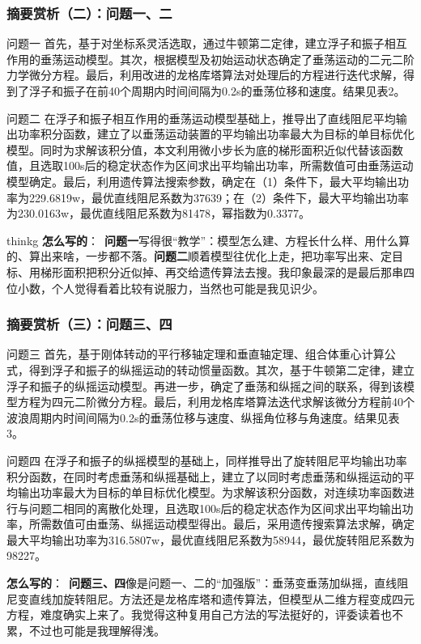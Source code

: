 \documentclass[aspectratio=169]{beamer}
\newcommand{\remarkg}[2]{%
	\vspace{0.12cm}%
	\begin{beamercolorbox}[rounded=true,sep=6pt]{thinkg}%
		{\color{orchidgold}\textbf{#1}：}~#2%
	\end{beamercolorbox}%
}
\newcommand{\remarkp}[2]{%
	\vspace{0.12cm}%
	{\color{orchidpurple}\textbf{#1}：}~#2\par%
}
\begin{document}
\begin{frame}
	\frametitle{摘要赏析（二）：问题一、二}
	\scriptsize
	\begin{block}{问题一}
		首先，基于对坐标系灵活选取，通过牛顿第二定律，建立浮子和振子相互作用的垂荡运动模型。其次，根据模型及初始运动状态确定了垂荡运动的二元二阶力学微分方程。最后，利用改进的龙格库塔算法对处理后的方程进行迭代求解，得到了浮子和振子在前40个周期内时间间隔为0.2s的垂荡位移和速度。结果见表2。
	\end{block}
	\begin{block}{问题二}
		在浮子和振子相互作用的垂荡运动模型基础上，推导出了直线阻尼平均输出功率积分函数，建立了以垂荡运动装置的平均输出功率最大为目标的单目标优化模型。同时为求解该积分值，本文利用微小步长为底的梯形面积近似代替该函数值，且选取100s后的稳定状态作为区间求出平均输出功率，所需数值可由垂荡运动模型确定。最后，利用遗传算法搜索参数，确定在（1）条件下，最大平均输出功率为229.6819w，最优直线阻尼系数为37639；在（2）条件下，最大平均输出功率为230.0163w，最优直线阻尼系数为81478，幂指数为0.3377。
	\end{block}
	\medskip
	\remarkg{怎么写的}{\textbf{问题一}写得很``教学''：模型怎么建、方程长什么样、用什么算的、算出来啥，一步都不落。\textbf{问题二}顺着模型往优化上走，把功率写出来、定目标、用梯形面积把积分近似掉、再交给遗传算法去搜。我印象最深的是最后那串四位小数，个人觉得看着比较有说服力，当然也可能是我见识少。}
\end{frame}

\begin{frame}
	\frametitle{摘要赏析（三）：问题三、四}
	\scriptsize
	\begin{block}{问题三}
		首先，基于刚体转动的平行移轴定理和垂直轴定理、组合体重心计算公式，得到浮子和振子的纵摇运动的转动惯量函数。其次，基于牛顿第二定律，建立浮子和振子的纵摇运动模型。再进一步，确定了垂荡和纵摇之间的联系，得到该模型方程为四元二阶微分方程。最后，利用龙格库塔算法迭代求解该微分方程前40个波浪周期内时间间隔为0.2s的垂荡位移与速度、纵摇角位移与角速度。结果见表3。
	\end{block}
	\begin{block}{问题四}
		在浮子和振子的纵摇模型的基础上，同样推导出了旋转阻尼平均输出功率积分函数，在同时考虑垂荡和纵摇基础上，建立了以同时考虑垂荡和纵摇运动的平均输出功率最大为目标的单目标优化模型。为求解该积分函数，对连续功率函数进行与问题二相同的离散化处理，且选取100s后的稳定状态作为区间求出平均输出功率，所需数值可由垂荡、纵摇运动模型得出。最后，采用遗传搜索算法求解，确定最大平均输出功率为316.5807w，最优直线阻尼系数为58944，最优旋转阻尼系数为98227。
	\end{block}
	\medskip
	\remarkp{怎么写的}{\textbf{问题三、四}像是问题一、二的``加强版''：垂荡变垂荡加纵摇，直线阻尼变直线加旋转阻尼。方法还是龙格库塔和遗传算法，但模型从二维方程变成四元方程，难度确实上来了。我觉得这种复用自己方法的写法挺好的，评委读着也不累，不过也可能是我理解得浅。}
\end{frame}
\end{document}
